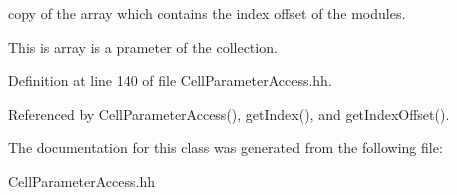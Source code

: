 copy of the array which contains the index offset of the modules. 

This is array is a prameter of the collection. 

Definition at line 140 of file Cell\-Parameter\-Access.\-hh.



Referenced by Cell\-Parameter\-Access(), get\-Index(), and get\-Index\-Offset().



The documentation for this class was generated from the following file\-:\begin{DoxyCompactItemize}
\item 
Cell\-Parameter\-Access.\-hh\end{DoxyCompactItemize}
